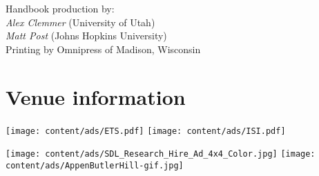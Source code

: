 \documentclass[twoside,makeidx]{book}
\begin{document}
\fancyfoot[C]{}


\fancyfoot[C]{\thepage}

\thispagestyle{empty}
\mbox{}

\vfill
\noindent Handbook production by: \\ 
\indent \emph{Alex Clemmer} (University of Utah) \\
\indent \emph{Matt Post} (Johns Hopkins University) \\  
Printing by Omnipress of Madison, Wisconsin
\newpage

\frontmatter

\clearpage

\clearpage

\clearpage%
\setheaders{}{}

\clearpage
%
\clearpage%
\setheaders{}{}

\setcounter{tocdepth}{2}
\tableofcontents
\mainmatter
\pagestyle{fancy}

%
\clearpage




% 
%
% 
%  
%  
%  




\chapter{Venue information}

\clearpage


\clearpage
{}


\cleardoublepage
{}
\printindex

\cleardoublepage
{}
\begin{center}
  \texttt{[image: content/ads/ETS.pdf]}
  \vfill
  \texttt{[image: content/ads/ISI.pdf]}
\end{center}
\newpage
\begin{center}
  \texttt{[image: content/ads/SDL\_Research\_Hire\_Ad\_4x4\_Color.jpg]}
  \vfill
  \texttt{[image: content/ads/AppenButlerHill-gif.jpg]}
\end{center}

\cleardoublepage



\end{document}
